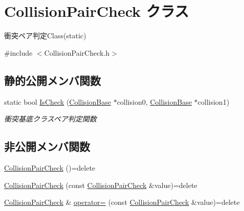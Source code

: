\hypertarget{class_collision_pair_check}{}\section{Collision\+Pair\+Check クラス}
\label{class_collision_pair_check}


衝突ペア判定\+Class(static)  




{\ttfamily \#include $<$Collision\+Pair\+Check.\+h$>$}

\subsection*{静的公開メンバ関数}
\begin{DoxyCompactItemize}
\item 
static bool \mbox{\hyperlink{class_collision_pair_check_aa7603c32ae782ad890280d360ae19dfe}{Is\+Check}} (\mbox{\hyperlink{class_collision_base}{Collision\+Base}} $\ast$collision0, \mbox{\hyperlink{class_collision_base}{Collision\+Base}} $\ast$collision1)
\begin{DoxyCompactList}\small\item\em 衝突基底クラスペア判定関数 \end{DoxyCompactList}\end{DoxyCompactItemize}
\subsection*{非公開メンバ関数}
\begin{DoxyCompactItemize}
\item 
\mbox{\hyperlink{class_collision_pair_check_a1b4609489f79e7f272e97d15893339b5}{Collision\+Pair\+Check}} ()=delete
\item 
\mbox{\hyperlink{class_collision_pair_check_a61d81de67fb69218a54dd1224ef30eee}{Collision\+Pair\+Check}} (const \mbox{\hyperlink{class_collision_pair_check}{Collision\+Pair\+Check}} \&value)=delete
\item 
\mbox{\hyperlink{class_collision_pair_check}{Collision\+Pair\+Check}} \& \mbox{\hyperlink{class_collision_pair_check_a32ebe7303801a6bfa9225c60ddb4b749}{operator=}} (const \mbox{\hyperlink{class_collision_pair_check}{Collision\+Pair\+Check}} \&value)=delete
\end{DoxyCompactItemize}
